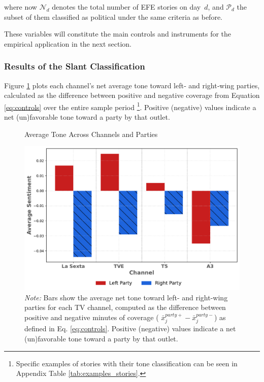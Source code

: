 \documentclass[12pt]{article}
\begin{document}
	where now \(\mathcal{N}_d\) denotes the total number of  EFE stories on day~\(d\), and \(\mathcal{P}_d\) the subset of them classified as political under the same criteria as before.
	
	
	
	These variables will constitute the main controls and instruments for the empirical application in the next section. 
	
	
	\subsubsection*{Results of the Slant Classification}
	
	
	
	Figure \ref{fig:chat} plots each channel’s net average tone toward left‐ and right‐wing parties, calculated as the difference between positive and negative coverage from Equation \eqref{eq:controls} over the entire sample period \footnote{Specific examples of stories with their tone classification can be seen in Appendix Table \ref{tab:examples_stories}.}. Positive (negative) values indicate a net (un)favorable tone toward a party by that outlet. 
	
	\begin{figure}[!htbp]
		\caption{Average Tone Across Channels and Parties}
		\centering
		\includegraphics[width=120mm]{figures/chatgpt}
		\caption*{\small \textit{Note:} Bars show the average net tone toward left- and right-wing parties for each TV channel, computed as the difference between positive and negative minutes of coverage ( $	\bar{x}_j^{party+}-\bar{x}_j^{party-}$) as defined in Eq. \eqref{eq:controls}. Positive (negative) values indicate a net (un)favorable tone toward a party by that outlet.}
		\label{fig:chat}
	\end{figure}
	
\end{document}
